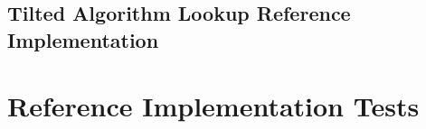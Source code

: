 

\subsection{Tilted Algorithm Lookup Reference Implementation}




\section{Reference Implementation Tests}


% 


% 


% 


